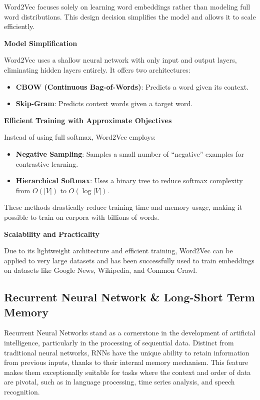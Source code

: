 Word2Vec focuses solely on learning word embeddings rather than modeling full word distributions. This design decision simplifies the model and allows it to scale efficiently.

\textbf{Model Simplification}

Word2Vec uses a shallow neural network with only input and output layers, eliminating hidden layers entirely. It offers two architectures:
\begin{itemize}
    \item \textbf{CBOW (Continuous Bag-of-Words)}: Predicts a word given its context.
    \item \textbf{Skip-Gram}: Predicts context words given a target word.
\end{itemize}

\textbf{Efficient Training with Approximate Objectives}

Instead of using full softmax, Word2Vec employs:

\begin{itemize}
    \item \textbf{Negative Sampling}: Samples a small number of ``negative'' examples for contrastive learning.
    \item \textbf{Hierarchical Softmax}: Uses a binary tree to reduce softmax complexity from $O(|V|)$ to $O(\log |V|)$.
\end{itemize}

These methods drastically reduce training time and memory usage, making it possible to train on corpora with billions of words.

\textbf{Scalability and Practicality}

Due to its lightweight architecture and efficient training, Word2Vec can be applied to very large datasets and has been successfully used to train embeddings on datasets like Google News, Wikipedia, and Common Crawl.

\subsection{Recurrent Neural Network \& Long-Short Term Memory}

Recurrent Neural Networks stand as a cornerstone in the development of artificial intelligence, particularly in the processing of sequential data. Distinct from traditional neural networks, RNNs have the unique ability to retain information from previous inputs, thanks to their internal memory mechanism. This feature makes them exceptionally suitable for tasks where the context and order of data are pivotal, such as in language processing, time series analysis, and speech recognition.

